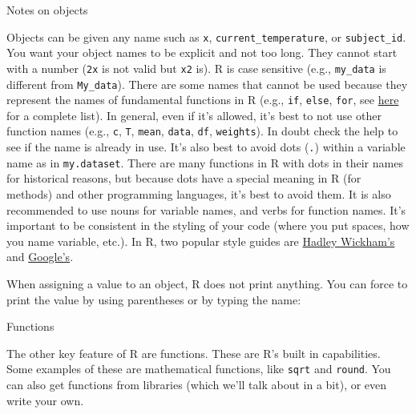 \documentclass[
  11pt,
  ignorenonframetext,
]{beamer}
\begin{document}
\begin{frame}[fragile]{Notes on objects}
\protect\hypertarget{notes-on-objects}{}

Objects can be given any name such as \texttt{x},
\texttt{current\_temperature}, or \texttt{subject\_id}. You want your
object names to be explicit and not too long. They cannot start with a
number (\texttt{2x} is not valid but \texttt{x2} is). R is case
sensitive (e.g., \texttt{my\_data} is different from \texttt{My\_data}).
There are some names that cannot be used because they represent the
names of fundamental functions in R (e.g., \texttt{if}, \texttt{else},
\texttt{for}, see
\href{https://stat.ethz.ch/R-manual/R-devel/library/base/html/Reserved.html}{here}
for a complete list). In general, even if it's allowed, it's best to not
use other function names (e.g., \texttt{c}, \texttt{T}, \texttt{mean},
\texttt{data}, \texttt{df}, \texttt{weights}). In doubt check the help
to see if the name is already in use. It's also best to avoid dots
(\texttt{.}) within a variable name as in \texttt{my.dataset}. There are
many functions in R with dots in their names for historical reasons, but
because dots have a special meaning in R (for methods) and other
programming languages, it's best to avoid them. It is also recommended
to use nouns for variable names, and verbs for function names. It's
important to be consistent in the styling of your code (where you put
spaces, how you name variable, etc.). In R, two popular style guides are
\href{http://adv-r.had.co.nz/Style.html}{Hadley Wickham's} and
\href{https://google-styleguide.googlecode.com/svn/trunk/Rguide.xml}{Google's}.

When assigning a value to an object, R does not print anything. You can
force to print the value by using parentheses or by typing the name:

\end{frame}

\begin{frame}[fragile]{Functions}
\protect\hypertarget{functions}{}

The other key feature of R are functions. These are R's built in
capabilities. Some examples of these are mathematical functions, like
\texttt{sqrt} and \texttt{round}. You can also get functions from
libraries (which we'll talk about in a bit), or even write your own.

\end{frame}
\end{document}
